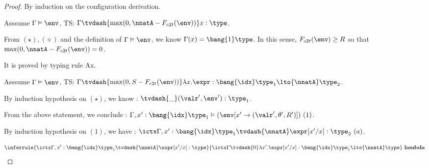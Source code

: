 \begin{proof}
  By induction on the configuration derivation.\\
   

  Asssume $\Gamma \vDash \env$,  TS: $\Gamma \tvdash{  \max(0, \nnatA-
    F_{c2t}(\env) ) } x: \type $.
  
  From $(\star), (\diamond)$ and the definition of $\Gamma \vDash
  \env$, we know $\Gamma(x) = \bang{1} \type$. In this sense, $
  F_{c2t}(\env)  \geq R $ so that $\max(0, \nnatA- F_{c2t}(\env) ) =0$.
  
 It is proved by typing rule Ax. \\

  

  


  Asssume $\Gamma \vDash \env$,  TS: $\Gamma \tvdash{ \max(0,  S-
    F_{c2t}(\env) ) } \lambda
  x. \expr: \bang{\idx} \type_1 \lto{\nnatA} \type_2 $.

  By induction hypothesis on $(\star)$, we know : $ \tvdash{ \_ }
  (\valr',\env') : \type_1 $.

  From the above statement, we conclude : $ \Gamma, x': \bang{\idx} \type_1
  \vDash ( \env[x' \to (\valr', \theta', R')] )~(1) $.

  By induction hypothesis on $(1)$, we have : $ \ictx \Gamma, x': \bang{\idx} \type_1
      \tvdash{\nnatA }
      \expr[x'/x]: \type_2 ~(a) $. 
  
  \[
 \inferrule{
      \ictx \Gamma, x': \bang{\idx} \type_1
      \tvdash{\nnatA }
      \expr[x'/x]: \type
    }{
      \ictx \Gamma \tvdash{0} \lambda x'. \expr[x'/x] : \bang{\idx} \type_1
      \lto{\nnatA} \type
    }~\textbf{lambda}
  \]




\end{proof}
